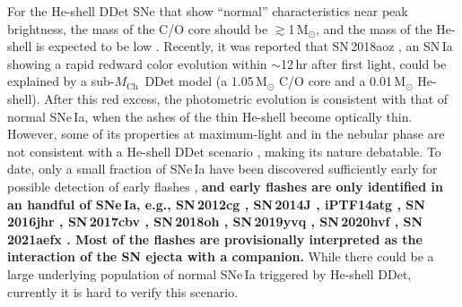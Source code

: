 \documentclass[twocolumn]{aastex631}
\newcommand{\Mch}{$M_\mathrm{Ch}$}
\newcommand{\revise}[1]{\textbf{#1}}
\begin{document}
For the He-shell DDet SNe that show ``normal'' characteristics near peak brightness, the mass of the C/O core should be $\gtrsim$1\,$\mathrm{M_\odot}$, and the mass of the He-shell is expected to be low \citep[$\lesssim$0.03\,$\mathrm{M_\odot}$;][]{polin_observational_2019,Magee_2021,Shen_2D_2021}. Recently, it was reported that SN\,2018aoz \citep{Ni_2022}, an SN\,Ia showing a rapid redward color evolution within $\sim$12\,hr after first light, could be explained by a sub-\Mch\ DDet model (a 1.05\,$\mathrm{M_\odot}$ C/O core and a 0.01\,$\mathrm{M_\odot}$ He-shell). After this red excess, the photometric evolution is consistent with that of normal SNe\,Ia, when the ashes of the thin He-shell become optically thin. However, some of its properties at maximum-light and in the nebular phase are not consistent with a He-shell DDet scenario \citep{Ni_2022b}, making its nature debatable. To date, only a small fraction of SNe\,Ia have been discovered sufficiently early for possible detection of early flashes \citep[e.g.,][]{Deckers_2022}, \revise{and early flashes are only identified in an handful of SNe\,Ia, e.g., SN\,2012cg \citep{Marion_12cg_2016}, SN\,2014J \citep{Goobar_2014J_2015}, iPTF14atg \citep{Cao_2015}, SN\,2016jhr \citep{jiang_16jhr_2017}, SN\,2017cbv \citep{Hosseinzadeh_17cbv_2017}, SN\,2018oh \citep{Dimitriadis_18oh_2019}, SN\,2019yvq \citep{Miller_2020}, SN\,2020hvf \citep{Jiang_20hvf_2021}, SN\,2021aefx \citep{Ashall_21aefx_2022, Hosseinzadeh_21aefx_2022}. Most of the flashes are provisionally interpreted as the interaction of the SN ejecta with a companion.} While there could be a large underlying population of normal SNe\,Ia triggered by He-shell DDet, currently it is hard to verify this scenario. 
\end{document}

